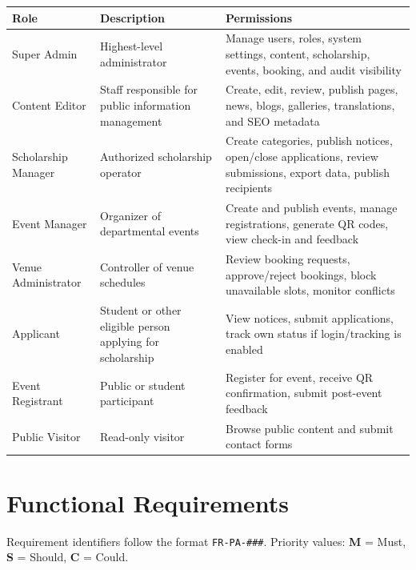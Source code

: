 \documentclass[12pt,a4paper]{article}
\newcommand{\thead}[1]{\textbf{\color{white}#1}}
\newcommand{\theadrow}{\rowcolor{headerblue}}
\begin{document}
\begin{longtable}{@{}L{3.4cm}L{4.4cm}L{6.3cm}@{}}
\theadrow \thead{Role} & \thead{Description} & \thead{Permissions} \\
\endhead
Super Admin & Highest-level administrator & Manage users, roles, system settings, content, scholarship, events, booking, and audit visibility \\
Content Editor & Staff responsible for public information management & Create, edit, review, publish pages, news, blogs, galleries, translations, and SEO metadata \\
Scholarship Manager & Authorized scholarship operator & Create categories, publish notices, open/close applications, review submissions, export data, publish recipients \\
Event Manager & Organizer of departmental events & Create and publish events, manage registrations, generate QR codes, view check-in and feedback \\
Venue Administrator & Controller of venue schedules & Review booking requests, approve/reject bookings, block unavailable slots, monitor conflicts \\
Applicant & Student or other eligible person applying for scholarship & View notices, submit applications, track own status if login/tracking is enabled \\
Event Registrant & Public or student participant & Register for event, receive QR confirmation, submit post-event feedback \\
Public Visitor & Read-only visitor & Browse public content and submit contact forms \\
\bottomrule
\end{longtable}

\section{Functional Requirements}

Requirement identifiers follow the format \texttt{FR-PA-\#\#\#}. Priority values: \textbf{M} = Must, \textbf{S} = Should, \textbf{C} = Could.
\end{document}
